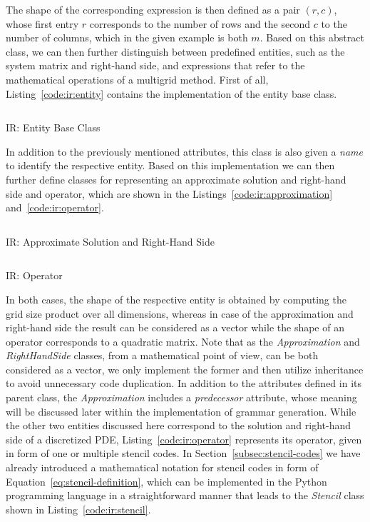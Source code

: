 The shape of the corresponding expression is then defined as a pair $(r, c)$, whose first entry $r$ corresponds to the number of rows and the second $c$ to the number of columns, which in the given example is both $m$.
Based on this abstract class, we can then further distinguish between predefined entities, such as the system matrix and right-hand side, and expressions that refer to the mathematical operations of a multigrid method.
First of all, Listing~\ref{code:ir:entity} contains the implementation of the entity base class.
\begin{listing}
	\inputminted{python}{evostencils/ir/entity.py}
	\caption{IR: Entity Base Class}
	\label{code:ir:entity}
\end{listing}
In addition to the previously mentioned attributes, this class is also given a \emph{name} to identify the respective entity.
Based on this implementation we can then further define classes for representing an approximate solution and right-hand side and operator, which are shown in the Listings~\ref{code:ir:approximation} and~\ref{code:ir:operator}.
\begin{listing}
	\inputminted{python}{evostencils/ir/approximation.py}
	\caption{IR: Approximate Solution and Right-Hand Side}
	\label{code:ir:approximation}
\end{listing}
\begin{listing}
	\inputminted{python}{evostencils/ir/operator.py}
	\caption{IR: Operator}
	\label{code:ir:operator}
\end{listing}
In both cases, the shape of the respective entity is obtained by computing the grid size product over all dimensions, whereas in case of the approximation and right-hand side the result can be considered as a vector while the shape of an operator corresponds to a quadratic matrix.
Note that as the \emph{Approximation} and \emph{RightHandSide} classes, from a mathematical point of view, can be both considered as a vector, we only implement the former and then utilize inheritance to avoid unnecessary code duplication.
In addition to the attributes defined in its parent class, the \emph{Approximation} includes a \emph{predecessor} attribute, whose meaning will be discussed later within the implementation of grammar generation.
While the other two entities discussed here correspond to the solution and right-hand side of a discretized PDE, Listing~\ref{code:ir:operator} represents its operator, given in form of one or multiple stencil codes.
In Section~\ref{subsec:stencil-codes} we have already introduced a mathematical notation for stencil codes in form of Equation~\ref{eq:stencil-definition}, which can be implemented in the Python programming language in a straightforward manner that leads to the \emph{Stencil} class shown in Listing~\ref{code:ir:stencil}.
